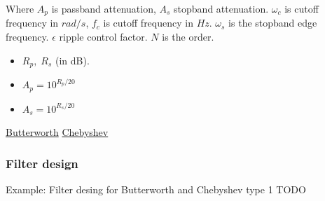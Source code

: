 \begin{multicols}{2}
Where $A_p$ is passband attenuation, $A_s$ stopband attenuation. 
$\omega_c$ is cutoff frequency in $rad/s$, $f_c$ is cutoff frequency in $Hz$.
$\omega_s$ is the stopband edge frequency. $\epsilon$ ripple control factor.
$N$ is the order.
\begin{itemize}
	\item $R_p, \; R_s$ (in dB). 
	\item $A_p=10^{R_p/20}$
	\item $A_s=10^{R_s/20}$
\end{itemize}

\href{https://en.wikipedia.org/wiki/Butterworth_filter}{Butterworth}
\href{https://www.semanticscholar.org/paper/Low-pass-filter-approximation-with-evolutionary-Ayten-Vural/447a00e54c1abb6e98ddf243a3de1cba33cd5200/figure/0}{Chebyshev}









\subsubsection{Filter design}
\begin{exampleblock}{Example: Filter desing for Butterworth and Chebyshev type 1}
	TODO
\end{exampleblock}


\end{multicols}
